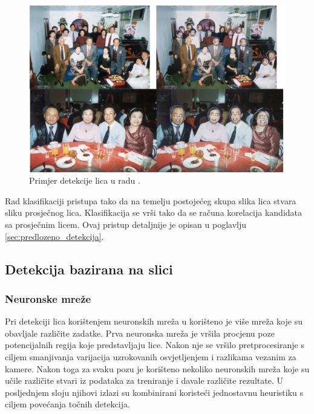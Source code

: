 \documentclass[times, utf8, seminar, numeric]{fer}
\begin{document}
\begin{figure}[!htb]
\centering
\includegraphics[width=\textwidth]{raw/detekcija_pr1.jpg}
\caption{Primjer detekcije lica u radu \cite{Senior:2002:FDC:513073.513082}.}
\label{fig:detekcija_pr1}
\end{figure}

Rad \cite{conf/isda/ChandrappaR12} klasifikaciji pristupa tako da na temelju postojećeg skupa slika lica stvara sliku prosječnog lica. Klasifikacija se vrši tako da se računa korelacija kandidata sa prosječnim licem. Ovaj pristup detaljnije je opisan u poglavlju \ref{sec:predlozeno_detekcija}.

\subsection{Detekcija bazirana na slici}

\subsubsection{Neuronske mreže}

Pri detekciji lica korištenjem neuronskih mreža u \cite{Rowley98neuralnetwork-based} korišteno je više mreža koje su obavljale različite zadatke. Prva neuronska mreža je vršila procjenu poze potencijalnih regija koje predstavljaju lice. Nakon nje se vršilo pretprocesiranje s ciljem smanjivanja varijacija uzrokovanih osvjetljenjem i razlikama vezanim za kamere. Nakon toga za svaku pozu je korišteno nekoliko neuronskih mreža koje su učile različite stvari iz podataka za treniranje i davale različite rezultate. U posljednjem sloju njihovi izlazi su kombinirani koristeći jednostavnu heuristiku s ciljem povećanja točnih detekcija.
\end{document}
